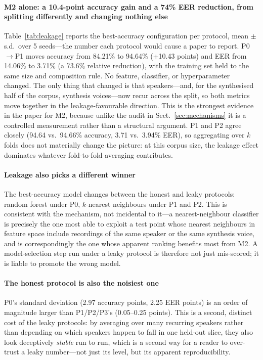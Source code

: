 \documentclass[sn-mathphys-num,pdflatex]{sn-jnl}
\begin{document}


\paragraph{M2 alone: a 10.4-point accuracy gain and a 74\% EER reduction, from
splitting differently and changing nothing else}
Table~\ref{tab:leakage} reports the best-accuracy configuration per protocol,
mean $\pm$ s.d.\ over 5 seeds---the number each protocol would cause a paper to
report. P0$\to$P1 moves accuracy from 84.21\% to 94.64\% (+10.43 points) and EER
from 14.06\% to 3.71\% (a 73.6\% relative reduction), with the training set held
to the same size and composition rule. No feature, classifier, or
hyperparameter changed. The only thing that changed is that speakers---and,
for the synthesised half of the corpus, synthesis voices---now recur across the
split, so both metrics move together in the leakage-favourable direction. This
is the strongest evidence in the paper for M2, because unlike the audit in
Sect.~\ref{sec:mechanisms} it is a controlled measurement rather than a
structural argument. P1 and P2 agree closely (94.64 vs.\ 94.66\% accuracy, 3.71
vs.\ 3.94\% EER), so aggregating over $k$ folds does not materially change the
picture: at this corpus size, the leakage effect dominates whatever
fold-to-fold averaging contributes.

\paragraph{Leakage also picks a different winner}
The best-accuracy model changes between the honest and leaky protocols: random
forest under P0, $k$-nearest neighbours under P1 and P2. This is consistent
with the mechanism, not incidental to it---a nearest-neighbour classifier is
precisely the one most able to exploit a test point whose nearest neighbours in
feature space include recordings of the same speaker or the same synthesis
voice, and is correspondingly the one whose apparent ranking benefits most from
M2. A model-selection step run under a leaky protocol is therefore not just
mis-scored; it is liable to promote the wrong model.

\paragraph{The honest protocol is also the noisiest one}
P0's standard deviation (2.97 accuracy points, 2.25 EER points) is an order of
magnitude larger than P1/P2/P3's (0.05--0.25 points). This is a second, distinct
cost of the leaky protocols: by averaging over many recurring speakers rather
than depending on which speakers happen to fall in one held-out slice, they also
look deceptively \emph{stable} run to run, which is a second way for a reader
to over-trust a leaky number---not just its level, but its apparent
reproducibility.
\end{document}
